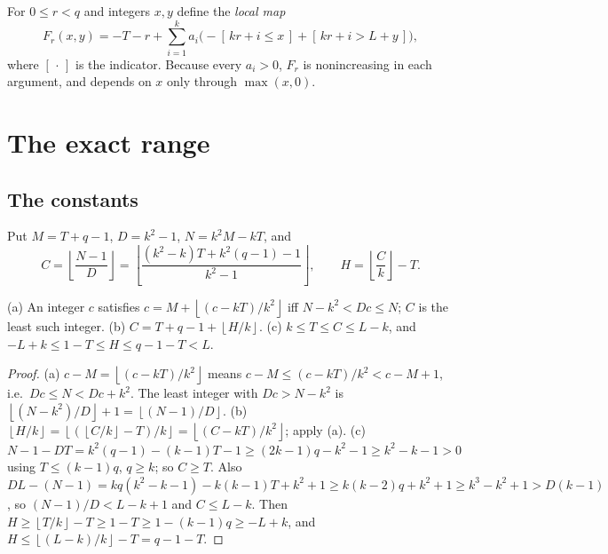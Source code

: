 \documentclass[11pt]{article}
\theoremstyle{remark}\newtheorem{remark}[theorem]{Remark}
\theoremstyle{definition}\newtheorem{definition}[theorem]{Definition}
\newcommand{\fl}[1]{\left\lfloor #1\right\rfloor}
\newcommand{\ind}[1]{[\,#1\,]}
\begin{document}
For \(0\le r<q\) and integers \(x,y\) define the \emph{local map}
\begin{equation}\label{F}
F_r(x,y)=-T-r+\sum_{i=1}^k a_i\bigl(-\ind{kr+i\le x}+\ind{kr+i>L+y}\bigr),
\end{equation}
where \(\ind{\cdot}\) is the indicator. Because every \(a_i>0\), \(F_r\) is nonincreasing in each argument, and depends on \(x\) only through \(\max(x,0)\).

\section{The exact range}
\subsection{The constants}
Put \(M=T+q-1\), \(D=k^2-1\), \(N=k^2M-kT\), and
\begin{equation}\label{CH}
C=\fl{\frac{N-1}{D}}=\fl{\frac{(k^2-k)T+k^2(q-1)-1}{k^2-1}},\qquad H=\fl{\frac Ck}-T.
\end{equation}

\begin{lemma}\label{arith}
(a) An integer \(c\) satisfies \(c=M+\fl{(c-kT)/k^2}\) iff \(N-k^2<Dc\le N\); \(C\) is the least such integer.
(b) \(C=T+q-1+\fl{H/k}\).
(c) \(k\le T\le C\le L-k\), and \(-L+k\le 1-T\le H\le q-1-T<L\).
\end{lemma}
\begin{proof}
(a) \(c-M=\fl{(c-kT)/k^2}\) means \(c-M\le (c-kT)/k^2<c-M+1\), i.e.\ \(Dc\le N<Dc+k^2\). The least integer with \(Dc>N-k^2\) is \(\fl{(N-k^2)/D}+1=\fl{(N-1)/D}\).
(b) \(\fl{H/k}=\fl{(\fl{C/k}-T)/k}=\fl{(C-kT)/k^2}\); apply (a).
(c) \(N-1-DT=k^2(q-1)-(k-1)T-1\ge(2k-1)q-k^2-1\ge k^2-k-1>0\) using \(T\le(k-1)q\), \(q\ge k\); so \(C\ge T\). Also \(DL-(N-1)=kq(k^2-k-1)-k(k-1)T+k^2+1\ge k(k-2)q+k^2+1\ge k^3-k^2+1>D(k-1)\), so \((N-1)/D<L-k+1\) and \(C\le L-k\). Then \(H\ge\fl{T/k}-T\ge1-T\ge1-(k-1)q\ge -L+k\), and \(H\le\fl{(L-k)/k}-T=q-1-T\).
\end{proof}
\end{document}
